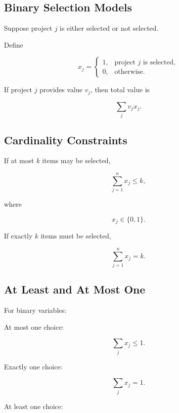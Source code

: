 \subsection{Binary Selection Models}
\label{subsec:binary-selection-models}

Suppose project \(j\) is either selected or not selected.

Define

\[
\boxed{
x_j
=
\begin{cases}
1,
&
\text{project }j\text{ is selected},
\\
0,
&
\text{otherwise}.
\end{cases}
}
\]

If project \(j\) provides value \(v_j\), then total value is

\[
\boxed{
\sum_j
v_jx_j.
}
\]

\subsection{Cardinality Constraints}
\label{subsec:cardinality-constraints}

If at most \(k\) items may be selected,

\[
\boxed{
\sum_{j=1}^{n}
x_j
\leq
k,
}
\]

where

\[
x_j\in\{0,1\}.
\]

If exactly \(k\) items must be selected,

\[
\boxed{
\sum_{j=1}^{n}
x_j
=
k.
}
\]

\subsection{At Least and At Most One}
\label{subsec:at-least-at-most-one}

For binary variables:

At most one choice:

\[
\boxed{
\sum_jx_j\leq1.
}
\]

Exactly one choice:

\[
\boxed{
\sum_jx_j=1.
}
\]

At least one choice:

